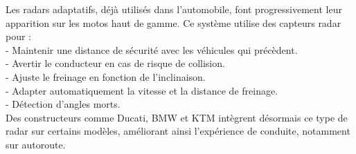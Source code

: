 \documentclass{article}
\begin{document}
Les radars adaptatifs, déjà utilisés dans l’automobile, font progressivement leur apparition sur les motos haut de gamme. Ce système utilise des capteurs radar pour :\\
- Maintenir une distance de sécurité avec les véhicules qui précèdent.\\
- Avertir le conducteur en cas de risque de collision.\\
- Ajuste le freinage en fonction de l'inclinaison.\\
- Adapter automatiquement la vitesse et la distance de freinage.\\
- Détection d'angles morts.\\
Des constructeurs comme Ducati, BMW et KTM intègrent désormais ce type de radar sur certains modèles, améliorant ainsi l’expérience de conduite, notamment sur autoroute.
\end{document}
